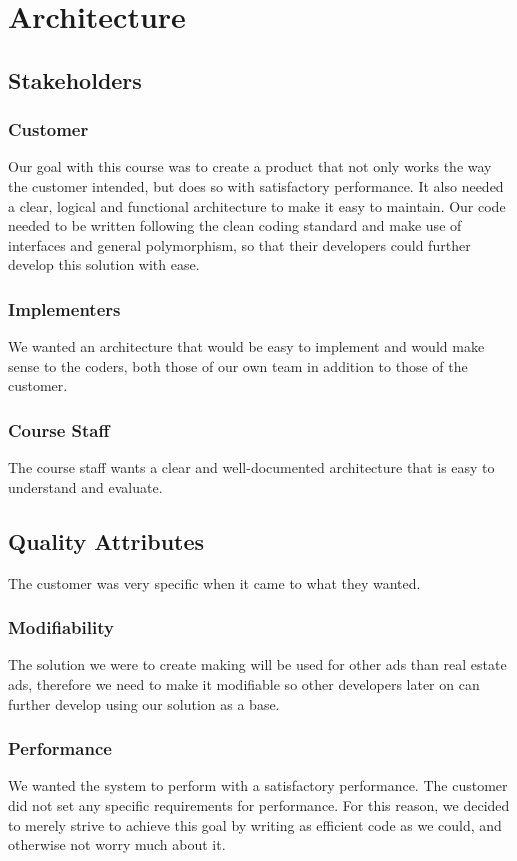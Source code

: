 \section{Architecture}

\subsection{Stakeholders}

\subsubsection{Customer}
Our goal with this course was to create a product that not only works the way the customer intended, but does so with satisfactory performance. It also needed a clear, logical and functional architecture to make it easy to maintain.
Our code needed to be written following the clean coding standard and make use of interfaces and general polymorphism, so that their developers could further develop this solution with ease.

\subsubsection{Implementers}
We wanted an architecture that would be easy to implement and would make sense to the coders, both those of our own team in addition to those of the customer.

\subsubsection{Course Staff}
The course staff wants a clear and well-documented architecture that is easy to understand and evaluate.

\subsection{Quality Attributes}
The customer was very specific when it came to what they wanted.
\subsubsection{Modifiability}
The solution we were to create making will be used for other ads than real estate ads, therefore we need to make it modifiable so other developers later on can further develop using our solution as a base.
\subsubsection{Performance}
We wanted the system to perform with a satisfactory performance. The customer did not set any specific requirements for performance. For this reason, we decided to merely strive to achieve this goal by writing as efficient code as we could, and otherwise not worry much about it. %

